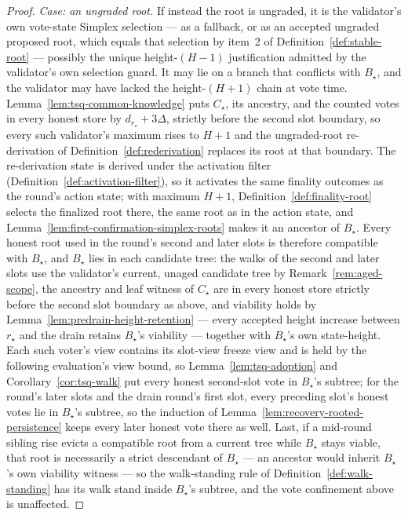 \begin{proof}
\emph{Case: an ungraded root.}  If instead the root is ungraded, it is the validator's own vote-state
Simplex selection --- as a fallback, or as an accepted ungraded proposed
root, which equals that selection by item~2 of
Definition~\ref{def:stable-root} --- possibly the unique
height-\((H{-}1)\) justification admitted by the validator's own
selection guard.  It may lie on a branch
that conflicts with \(B_\star\), and the validator may have lacked the
height-\((H{+}1)\) chain at vote time.  Lemma~\ref{lem:tsq-common-knowledge} puts
\(C_\star\), its ancestry, and the counted votes in every honest store by
\(d_{r_\star}+3\Delta\), strictly before the second slot boundary, so
every such validator's maximum rises to \(H+1\) and the
ungraded-root re-derivation
of Definition~\ref{def:rederivation} replaces its root at that
boundary.  The re-derivation state is derived under the activation
filter (Definition~\ref{def:activation-filter}), so it activates the same
finality outcomes as the round's action state; with maximum \(H+1\),
Definition~\ref{def:finality-root} selects the finalized root there,
the same root as in the action state, and
Lemma~\ref{lem:first-confirmation-simplex-roots} makes it an ancestor of
\(B_\star\).  Every honest root used
in the round's second and later slots is therefore compatible with
\(B_\star\), and \(B_\star\) lies in each candidate tree: the walks of
the second and later slots use the validator's current, unaged candidate
tree by Remark~\ref{rem:aged-scope}, the ancestry and leaf
witness of \(C_\star\) are in every honest store strictly before the
second slot boundary as above, and viability holds by
Lemma~\ref{lem:predrain-height-retention} --- every accepted height
increase between \(r_\star\) and the drain retains \(B_\star\)'s
viability --- together with \(B_\star\)'s own state-height.  Each such
voter's view contains its slot-view freeze view and is held by the
following evaluation's view bound, so Lemma~\ref{lem:tsq-adoption} and
Corollary~\ref{cor:tsq-walk} put every honest second-slot vote in
\(B_\star\)'s subtree; for the round's later slots and the drain round's
first slot, every preceding slot's honest votes lie in \(B_\star\)'s
subtree, so the induction of Lemma~\ref{lem:recovery-rooted-persistence}
keeps every later honest vote there as well.  Last, if a mid-round
sibling rise evicts a compatible root from a current tree while
\(B_\star\) stays viable, that root is necessarily a strict
descendant of \(B_\star\) --- an ancestor would inherit
\(B_\star\)'s own viability witness --- so the walk-standing rule of
Definition~\ref{def:walk-standing} has its walk stand inside
\(B_\star\)'s subtree, and the vote confinement above is unaffected.
\end{proof}

